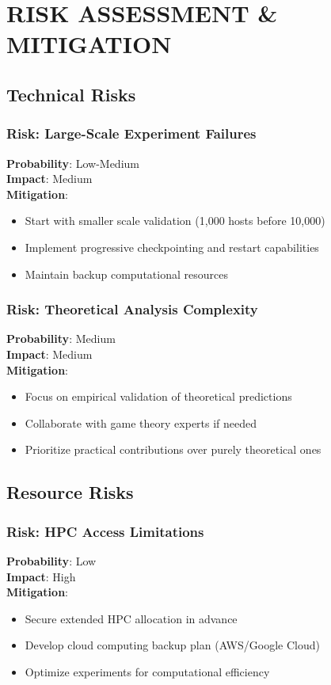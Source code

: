 \documentclass[11pt]{article}
\begin{document}
\section{RISK ASSESSMENT \& MITIGATION}

\subsection{Technical Risks}

\subsubsection{Risk: Large-Scale Experiment Failures}
\textbf{Probability}: Low-Medium \\
\textbf{Impact}: Medium \\
\textbf{Mitigation}:
\begin{itemize}
\item Start with smaller scale validation (1,000 hosts before 10,000)
\item Implement progressive checkpointing and restart capabilities
\item Maintain backup computational resources
\end{itemize}

\subsubsection{Risk: Theoretical Analysis Complexity}
\textbf{Probability}: Medium \\
\textbf{Impact}: Medium \\
\textbf{Mitigation}:
\begin{itemize}
\item Focus on empirical validation of theoretical predictions
\item Collaborate with game theory experts if needed
\item Prioritize practical contributions over purely theoretical ones
\end{itemize}

\subsection{Resource Risks}

\subsubsection{Risk: HPC Access Limitations}
\textbf{Probability}: Low \\
\textbf{Impact}: High \\
\textbf{Mitigation}:
\begin{itemize}
\item Secure extended HPC allocation in advance
\item Develop cloud computing backup plan (AWS/Google Cloud)
\item Optimize experiments for computational efficiency
\end{itemize}
\end{document}
